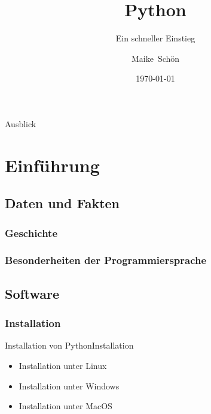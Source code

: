 \documentclass{beamer}
\title[Pythonkurs für Einsteiger] %
{Python}
\subtitle
{Ein schneller Einstieg} %
\author[Frühjahrskurs 2014 am RRZK] %
{Maike~Schön} %
\date[Short Occasion] %
{ \today }
\begin{document}
\begin{frame}
  \titlepage
\end{frame}

\begin{frame}{Ausblick}
  \tableofcontents
\end{frame}




\section{Einf\" uhrung}

\subsection[Hintergrundwissen]{Daten und Fakten}
\subsubsection{Geschichte}
\subsubsection{Besonderheiten der Programmiersprache}
\subsubsection{}

\subsection[Installation von Python und weitere n\" utzliche Software]{Software}
\subsubsection{Installation}

\begin{frame}{Installation von Python}{Installation}

  \begin{itemize}
  \item
    Installation unter Linux
  \item
    Installation unter Windows
  \item
    Installation unter MacOS
  \end{itemize}
\end{frame}
\end{document}
